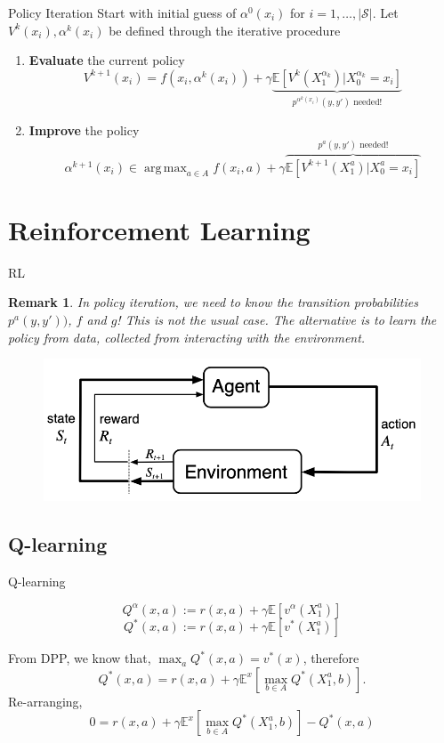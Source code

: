 \documentclass{beamer}
\newtheorem{remark}{Remark}[theorem]
\DeclareMathOperator*{\argmax}{arg\,max}
\begin{document}
\begin{frame}{Policy Iteration}
Start with initial guess of $\alpha^0(x_i)$ for $i=1,\ldots,|\mathcal S|$. Let $V^k(x_i), \alpha^k(x_i)$ be defined through the iterative procedure
	\begin{enumerate}
	\item \textbf{Evaluate} the current policy
\[
V^{k+1}(x_i) = f(x_i, \alpha^k(x_i)) + \gamma \underbrace{\mathbb E\left[V^k(X_1^{\alpha_k})|X_0^{\alpha_k}=x_i\right]}_{p^{\alpha^k(x_i)}(y,y') \text{ needed}!}
\]
	\item \textbf{Improve} the policy
\[\alpha^{k+1}(x_i) \in \argmax_{a\in A} f(x_i, a) + \gamma \overbrace{\mathbb E\left[V^{k+1}(X_1^{a})|X_0^{a}=x_i\right]}^{p^{a}(y,y') \text{ needed}!} \]
	\end{enumerate}

\end{frame}

\section{Reinforcement Learning}
\begin{frame}{RL}
\begin{remark}
	In policy iteration, we need to know the transition probabilities $p^a(y,y'))$, $f$ and $g$! This is not the usual case. The alternative is to learn the policy from data, collected from interacting with the environment. 
\end{remark}
\begin{figure}[h]
\includegraphics[width=0.65\linewidth]{images/RL.png}
\end{figure}
\end{frame}

\subsection{Q-learning}
\begin{frame}{Q-learning}
\begin{Definition}[Q-function]
	\[
	Q^\alpha(x,a) := r(x,a) + \gamma \mathbb E [v^\alpha(X_1^a)]
	\]
	\[
	Q^*(x,a) := r(x,a) + \gamma \mathbb E [v^*(X_1^a)]
	\]
\end{Definition}



From DPP, we know that, $\max_a Q^*(x,a) = v^*(x)$, therefore
\[
Q^*(x,a) = r(x,a) + \gamma \mathbb E^x [\max_{b\in A}Q^*(X^a_1,b)].
\]
Re-arranging, 
\[
0 = r(x,a) + \gamma \mathbb E^x [\max_{b\in A}Q^*(X^a_1,b)] - Q^*(x,a)
\]
\end{frame}
\end{document}
